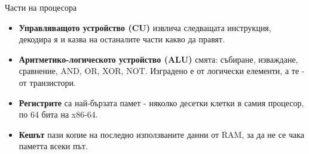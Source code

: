 \documentclass[14pt, aspectratio=169]{beamer}
\begin{document}
\begin{frame}{Части на процесора}
  \begin{itemize}
    \item \textbf{Управляващото устройство (CU)} извлича следващата инструкция,
      декодира я и казва на останалите части какво да правят.
    \item \textbf{Аритметико-логическото устройство (ALU)} смята: събиране,
      изваждане, сравнение, AND, OR, XOR, NOT. Изградено е от логически
      елементи, а те - от транзистори.
    \item \textbf{Регистрите} са най-бързата памет - няколко десетки клетки в
      самия процесор, по 64 бита на x86-64.
    \item \textbf{Кешът} пази копие на последно използваните данни от RAM, за
      да не се чака паметта всеки път.
  \end{itemize}
\end{frame}
\end{document}
